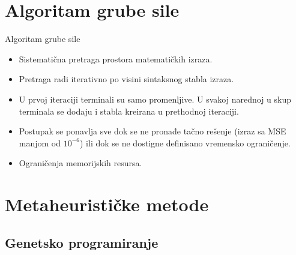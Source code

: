 \documentclass{beamer}
\begin{document}
\section{Algoritam grube sile}
\begin{frame}{Algoritam grube sile}
\begin{itemize}
\small
    \item Sistematična pretraga prostora matematičkih izraza.
    \item Pretraga radi iterativno po visini sintaksnog stabla izraza.
    \item U prvoj iteraciji terminali su samo promenljive. U svakoj narednoj u skup terminala se dodaju i stabla kreirana u prethodnoj iteraciji.
    \item Postupak se ponavlja sve dok se ne pronađe tačno rešenje (izraz sa MSE manjom od $10^{-6}$) ili dok se ne dostigne definisano vremensko ograničenje.
    \item Ograničenja memorijskih resursa.
\end{itemize}
\end{frame}



\section{Metaheurističke metode}

\subsection{Genetsko programiranje}
\end{document}

